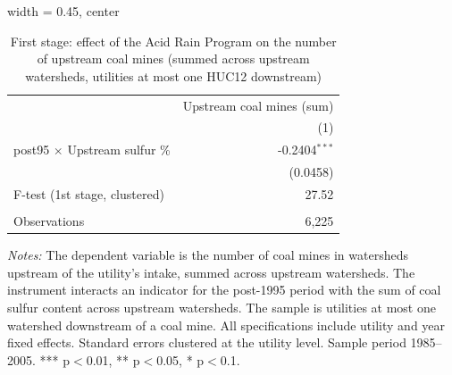 
\begin{table}[htbp]
   
   \caption{\label{tab:fs_dwnstrm_minevio_ivsum_binvio} First stage: effect of the Acid Rain Program on the number of upstream coal mines (summed across upstream watersheds, utilities at most one HUC12 downstream)}
   \bigskip
   
   \centering
   
   \begin{adjustbox}{width = 0.45\textwidth, center}
      
      
      \begin{tabular}{lr}
         \toprule
         
                                              & Upstream coal mines (sum)\\  
         
                                              & (1)\\  
         
         \midrule 
         post95 $\times$ Upstream sulfur \%   & -0.2404$^{***}$\\   
                                              & (0.0458)\\   
         
         F-test (1st stage, clustered)        & 27.52\\  
         
          \\
         
         Observations                         & 6,225\\  
         
         \bottomrule
         
      \end{tabular}
      
      
      
   \end{adjustbox}
      {\tiny\linespread{1}\selectfont \par \raggedright 
   \textit{Notes:} The dependent variable is the number of coal mines in watersheds upstream of the utility's intake, summed across upstream watersheds. The instrument interacts an indicator for the post-1995 period with the sum of coal sulfur content across upstream watersheds. The sample is utilities at most one watershed downstream of a coal mine. All specifications include utility and year fixed effects. Standard errors clustered at the utility level. Sample period 1985--2005. *** p$<$0.01, ** p$<$0.05, * p$<$0.1.}
   
\end{table}


